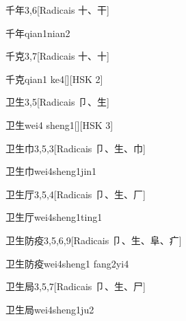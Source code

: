 \begin{entry}{千年}{3,6}[Radicais ⼗、⼲]
  \begin{phonetics}{千年}{qian1nian2}
  \end{phonetics}
\end{entry}

\begin{entry}{千克}{3,7}[Radicais ⼗、⼗]
  \begin{phonetics}{千克}{qian1 ke4}[][HSK 2]
  \end{phonetics}
\end{entry}

\begin{entry}{卫生}{3,5}[Radicais ⼙、⽣]
  \begin{phonetics}{卫生}{wei4 sheng1}[][HSK 3]
  \end{phonetics}
\end{entry}

\begin{entry}{卫生巾}{3,5,3}[Radicais ⼙、⽣、⼱]
  \begin{phonetics}{卫生巾}{wei4sheng1jin1}
  \end{phonetics}
\end{entry}

\begin{entry}{卫生厅}{3,5,4}[Radicais ⼙、⽣、⼚]
  \begin{phonetics}{卫生厅}{wei4sheng1ting1}
  \end{phonetics}
\end{entry}

\begin{entry}{卫生防疫}{3,5,6,9}[Radicais ⼙、⽣、⾩、⽧]
  \begin{phonetics}{卫生防疫}{wei4sheng1 fang2yi4}
  \end{phonetics}
\end{entry}

\begin{entry}{卫生局}{3,5,7}[Radicais ⼙、⽣、⼫]
  \begin{phonetics}{卫生局}{wei4sheng1ju2}
  \end{phonetics}
\end{entry}

